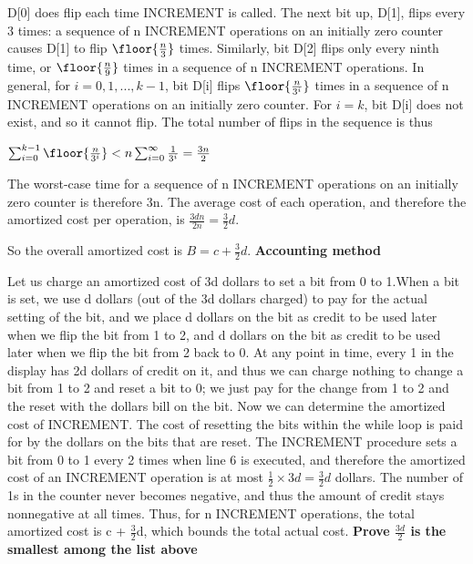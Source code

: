 \documentclass[11pt, answers]{exam}
\theoremstyle{plain}
\theoremstyle{definition}
\begin{document}
\begin{questions}
\begin{solution}
\begin{enumerate}
D[0] does flip each time INCREMENT is called.
The next bit up, D[1], flips every 3 times: a sequence of n INCREMENT operations on an initially zero counter causes D[1] to flip $\floor{\frac{n}{3}}$ times. Similarly,
bit D[2] flips only every ninth time, or $\floor{\frac{n}{9}}$ times in a sequence of n INCREMENT
operations. In general, for $i = 0, 1, ..., k - 1$, bit D[i] flips $\floor{\frac{n}{3^i}}$ times in a
sequence of n INCREMENT operations on an initially zero counter. For $i = k$,
bit D[i] does not exist, and so it cannot flip. The total number of flips in the
sequence is thus

$\sum_{i=0}^{k-1}\floor{\frac{n}{3^i}} < n\sum_{i=0}^{\infty}{\frac{1}{3^i}} = {\frac{3n}{2}}$

The worst-case time for a sequence of n INCREMENT operations
on an initially zero counter is therefore 3n. The average cost of each operation,
and therefore the amortized cost per operation, is $\frac{3dn}{2n} = {\frac{3}{2}}d$.
\end{enumerate}
\qquad So the overall amortized cost is $B = c + {\frac{3}{2}}d$. \newline
\newline
\textbf{Accounting method}

Let us charge an amortized cost of 3d dollars to set a bit from 0 to 1.When a bit is set, we use d dollars (out of the 3d dollars charged) to pay for the actual setting of the bit, and we place d dollars on the bit as credit to be used later when we flip the bit from 1 to 2, and d dollars on the bit as credit to be used later when we flip the bit from 2 back to 0. At any point in time, every 1 in the display has 2d dollars of credit on it, and thus we can charge nothing to change a bit from 1 to 2 and reset a bit to 0; we just pay for the change from 1 to 2 and the reset with the dollars bill on the bit. Now we can determine the amortized cost of INCREMENT. The cost of resetting the bits within the while loop is paid for by the dollars on the bits that are reset. The INCREMENT procedure sets a bit from 0 to 1 every 2 times when line 6 is executed, and therefore the amortized cost of an INCREMENT operation is at most ${\frac{1}{2}} \times 3d = {\frac{3}{2}}d$ dollars. The number of 1s in the counter never becomes negative, and thus the amount of credit stays nonnegative at all times. Thus, for n INCREMENT operations, the total amortized cost is c + ${\frac{3}{2}}$d, which bounds the total actual cost.
\newline
\newline
\textbf{Prove ${\frac{3d}{2}}$ is the smallest among the list above}


\end{solution}
\end{questions}
\end{document}

